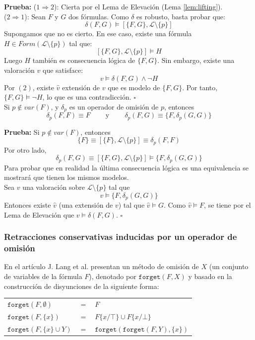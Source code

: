 \noindent \textbf{Prueba:} ($1 \Rightarrow 2$): Cierta por el Lema de Elevación (Lema \ref{lem:lifting}).\\
($2 \Rightarrow 1$): Sean $F$ y $G$ dos fórmulas. Como $\delta$ es robusto, basta probar que:
$$\delta (F,G) \vDash [\{ F,G \}, \mathcal{L} \setminus \{ p \}]$$
Supongamos que no es cierto. En ese caso, existe una fórmula $H \in Form(\mathcal{L} \setminus \{ p \})$ tal que: 
$$[\{ F,G \}, \mathcal{L} \setminus \{ p \}] \vDash H$$ 
Luego $H$ también es consecuencia lógica de $\{ F,G \}$. Sin embargo, existe una valoración $v$ que satisface: 
$$v \vDash \delta (F,G) \wedge \neg H$$ 
Por $(2)$, existe $\hat{v}$ extensión de $v$ que es modelo de $\{ F,G \}$. Por tanto, $\{ F,G \} \vDash \neg H$, lo que es una contradicción. \hspace{10.5cm} $\square$ \\

\cor Si $p \notin var(F)$, y $\delta_p$ es un operador de omisión de $p$, entonces
$$\delta_p(F,F) \equiv F \;\;\;\;\;\;\;\; \text{y} \;\;\;\;\;\;\;\; \delta_p (F,G) \equiv \{ F,\delta_p (G,G) \}$$

\noindent \label{cor:pnotinvar} \textbf{Prueba:} Si $p \notin var(F)$, entonces 
$$\{ F \} \equiv [\{ F \} ,\mathcal{L} \setminus \{ p \}] \equiv \delta_p (F,F)$$
Por otro lado, 
$$\delta_p (F,G) \equiv [\{ F,G \} , \mathcal{L} \setminus \{ p \}] \vDash \{ F,\delta_p (G,G) \}$$ Para probar que en realidad la última consecuencia lógica es una equivalencia se mostrará que tienen los mismos modelos.\\
Sea $v$ una valoración sobre $\mathcal{L} \setminus \{ p \}$ tal que $$v \vDash \{ F,\delta_p (G,G) \}$$ Entonces existe $\hat{v}$ (una extensión de $v$) tal que $\hat{v} \vDash G$. Como $\hat{v} \vDash F$, se tiene por el Lema de Elevación que $v \vDash \delta (F,G)$. \hspace{10cm} $\square$ 
 
\subsubsection{Retracciones conservativas inducidas por un operador de omisión} 
 
En el artículo \cite{Lang2003} J. Lang et al.  presentan un método de omisión de $X$ (un conjunto de variables de la fórmula $F$), denotado por $\texttt{forget}(F,X)$ y basado en la construcción de disyunciones de la siguiente forma:\\

\begin{tabular}{lll}
$\texttt{forget}(F, \emptyset)$ & $=$ & $F$\\
$\texttt{forget}(F, \{ x \})$ & $= $ & $F\{x/\top \} \cup F\{x/\bot \}$ \\
$\texttt{forget}(F, \{ x \} \cup Y)$ & $= $ & $\texttt{forget} (\texttt{forget}(F,Y),\{ x \})$
\end{tabular}

